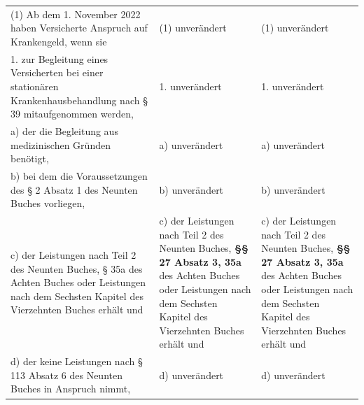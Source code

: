 \documentclass[10pt,a4paper,landscape]{article}
\begin{document}
\begin{longtable}{|L{8.2cm}|L{8.2cm}|L{8.2cm}|}
\hhline{|---|}
(1) Ab dem 1. November 2022 haben  \newline Versicherte Anspruch auf Krankengeld,  \newline wenn sie & (1) unverändert & (1) unverändert \\
\hhline{|---|}
1.   \newline zur Begleitung eines Versicherten bei einer  \newline stationären Krankenhausbehandlung nach  \newline \S{} 39 mitaufgenommen werden, & 1. unverändert & 1. unverändert \\
\hhline{|---|}
a)   \newline der die Begleitung aus medizinischen  \newline Gründen benötigt, & a) unverändert & a) unverändert \\
\hhline{|---|}
b)  \newline bei dem die Voraussetzungen des \S{} 2  \newline Absatz 1 des Neunten Buches vorliegen, & b) unverändert & b) unverändert \\
\hhline{|---|}
c)  \newline der Leistungen nach Teil 2 des Neunten  \newline Buches, \textcolor{diffred}{\S{}} 35a des Achten Buches oder  \newline Leistungen nach dem Sechsten Kapitel des  \newline Vierzehnten Buches erhält und & c)  \newline der Leistungen nach Teil 2 des Neunten  \newline Buches, \textbf{\S{}\S{} 27 Absatz 3, 35a} des Achten  \newline Buches oder Leistungen nach dem  \newline Sechsten Kapitel des Vierzehnten Buches  \newline erhält und & c)  \newline der Leistungen nach Teil 2 des Neunten  \newline Buches, \textbf{\S{}\S{} 27 Absatz 3, 35a} des Achten  \newline Buches oder Leistungen nach dem  \newline Sechsten Kapitel des Vierzehnten Buches  \newline erhält und \\
\hhline{|---|}
d)  \newline der keine Leistungen nach \S{} 113 Absatz 6  \newline des Neunten Buches in Anspruch nimmt, & d) unverändert & d) unverändert \\

\end{longtable}
\end{document}
